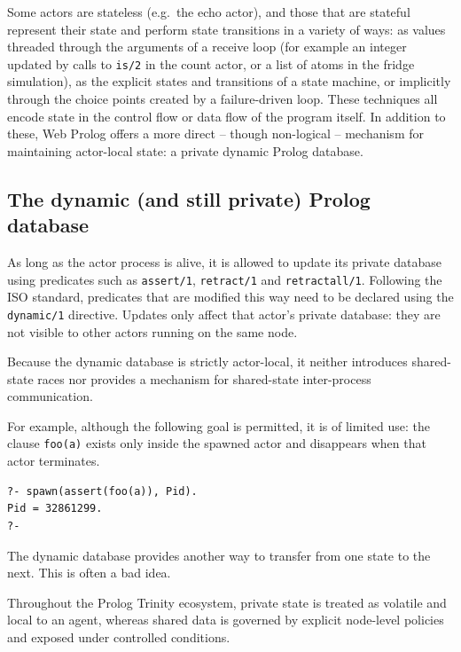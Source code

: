Some actors are stateless (e.g.\ the echo actor), and those that are stateful represent their state and perform state transitions in a variety of ways: as values threaded through the arguments of a receive loop (for example an integer updated by calls to \texttt{is/2} in the count actor, or a list of atoms in the fridge simulation), as the explicit states and transitions of a state machine, or implicitly through the choice points created by a failure-driven loop. These techniques all encode state in the control flow or data flow of the program itself. In addition to these, Web Prolog offers a more direct -- though non-logical -- mechanism for maintaining actor-local state: a private dynamic Prolog database.

\subsection{The dynamic (and still private) Prolog database}\label{sec:dynamic-private-database}

\noindent As long as the actor process is alive, it is allowed to update its private database using predicates such as \texttt{assert/1}, \texttt{retract/1} and \texttt{retractall/1}. Following the ISO standard, predicates that are modified this way need to be declared using the \texttt{dynamic/1} directive. Updates only affect that actor's private database: they are not visible to other actors running on the same node.

Because the dynamic database is strictly actor-local, it neither introduces shared-state races nor provides a mechanism for shared-state inter-process communication.

For example, although the following goal is permitted, it is of limited use: the clause \texttt{foo(a)} exists only inside the spawned actor and disappears when that actor terminates.

\begin{verbatim}
?- spawn(assert(foo(a)), Pid).
Pid = 32861299.
?-
\end{verbatim}

\noindent The dynamic database provides another way to transfer from one state to the next. This is often a bad idea.

\medskip
\noindent
Throughout the Prolog Trinity ecosystem, private state is treated as volatile and local to an agent, whereas shared data is governed by explicit node-level policies and exposed under controlled conditions.


